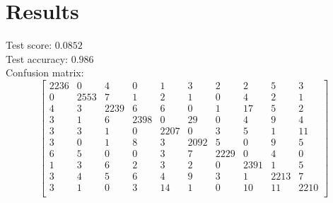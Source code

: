 \documentclass[paper=a4, fontsize=11pt]{scrartcl} %
\begin{document}
\section{Results}
    Test score: $0.0852$ \\
    Test accuracy: $0.986$ \\
    Confusion matrix:
    \[ \left[ \begin{array}{cccccccccc}
        2236 &    0 &    4 &    0 &    1 &    3 &    2 &    2 &    5 &    3 \\
           0 & 2553 &    7 &    1 &    2 &    1 &    0 &    4 &    2 &    1 \\
           4 &    3 & 2239 &    6 &    6 &    0 &    1 &   17 &    5 &    2 \\
           3 &    1 &    6 & 2398 &    0 &   29 &    0 &    4 &    9 &    4 \\
           3 &    3 &    1 &    0 & 2207 &    0 &    3 &    5 &    1 &   11 \\
           3 &    0 &    1 &    8 &    3 & 2092 &    5 &    0 &    9 &    5 \\
           6 &    5 &    0 &    0 &    3 &    7 & 2229 &    0 &    4 &    0 \\
           1 &    3 &    6 &    2 &    3 &    2 &    0 & 2391 &    1 &    5 \\
           3 &    4 &    5 &    6 &    4 &    9 &    3 &    1 & 2213 &    7 \\
           3 &    1 &    0 &    3 &   14 &    1 &    0 &   10 &   11 & 2210 \\
    \end{array} \right] \]
\end{document}
